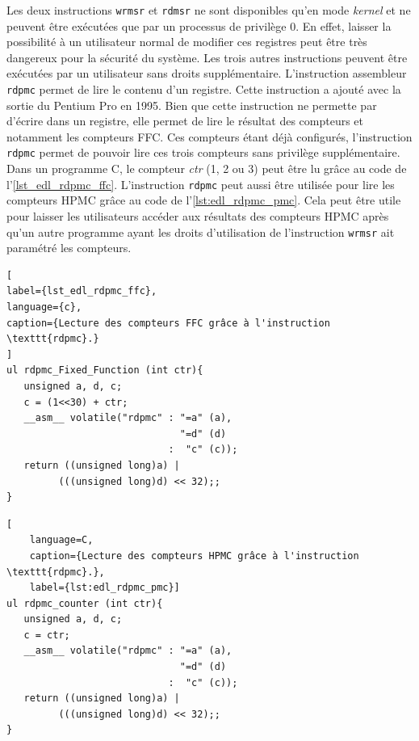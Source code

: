         Les deux instructions \verb|wrmsr| et \verb|rdmsr| ne sont disponibles qu'en mode \textit{kernel} et ne peuvent être exécutées que par un processus de privilège 0. En effet, laisser la possibilité à un utilisateur normal de modifier ces registres peut être très dangereux pour la sécurité du système. Les trois autres instructions peuvent être exécutées par un utilisateur sans droits supplémentaire. L'instruction assembleur \verb|rdpmc| permet de lire le contenu d'un registre. Cette instruction a ajouté avec la sortie du Pentium Pro en 1995. Bien que cette instruction ne permette par d'écrire dans un registre, elle permet de lire le résultat des compteurs et notamment les compteurs FFC. Ces compteurs étant déjà configurés, l'instruction \verb|rdpmc| permet de pouvoir lire ces trois compteurs sans privilège supplémentaire. Dans un programme C, le compteur \textit{ctr} (1, 2 ou 3) peut être lu grâce au code de l'\autoref{lst_edl_rdpmc_ffc}. L'instruction \verb|rdpmc| peut aussi être utilisée pour lire les compteurs HPMC grâce au code de l'\autoref{lst:edl_rdpmc_pmc}. Cela peut être utile pour laisser les utilisateurs accéder aux résultats des compteurs HPMC après qu'un autre programme ayant les droits d'utilisation de l'instruction \verb|wrmsr| ait paramétré les compteurs.

\begin{minipage}{\linewidth}
\begin{lstlisting}[
label={lst_edl_rdpmc_ffc},
language={c},
caption={Lecture des compteurs FFC grâce à l'instruction \texttt{rdpmc}.}
]
ul rdpmc_Fixed_Function (int ctr){
   unsigned a, d, c;
   c = (1<<30) + ctr;
   __asm__ volatile("rdpmc" : "=a" (a), 
                              "=d" (d) 
                            :  "c" (c));
   return ((unsigned long)a) | 
         (((unsigned long)d) << 32);;
}
\end{lstlisting}
\end{minipage}

\begin{minipage}{\linewidth}
\begin{lstlisting}[
    language=C, 
    caption={Lecture des compteurs HPMC grâce à l'instruction \texttt{rdpmc}.},
    label={lst:edl_rdpmc_pmc}]
ul rdpmc_counter (int ctr){
   unsigned a, d, c;
   c = ctr;
   __asm__ volatile("rdpmc" : "=a" (a),
                              "=d" (d)
                            :  "c" (c));
   return ((unsigned long)a) | 
         (((unsigned long)d) << 32);;
}
\end{lstlisting}
\end{minipage}


